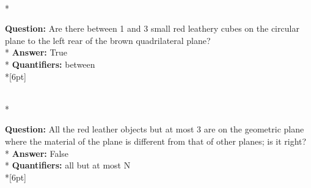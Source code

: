 \begin{figure*}
\begin{minipage}{0.48\textwidth}
\begin{minipage}[t][2.2cm][t]{1\textwidth}
    \end{minipage}\\*
    \begin{minipage}[t][2.2cm][t]{1\textwidth}
      \footnotesize
      \textbf{Question:} Are there between 1 and 3 small red leathery cubes on the circular plane to the left rear of the brown quadrilateral plane? \\*
      \textbf{Answer:} True \\*
      \textbf{Quantifiers:} between \\*[6pt]
    \end{minipage}\\*
    \begin{minipage}[t][2.2cm][t]{1\textwidth}
      \footnotesize
      \textbf{Question:} All the red leather objects but at most 3 are on the geometric plane where the material of the plane is different from that of other planes; is it right? \\*
      \textbf{Answer:} False \\*
      \textbf{Quantifiers:} all but at most N \\*[6pt]
    \end{minipage}
  \end{minipage}
\end{figure*}




